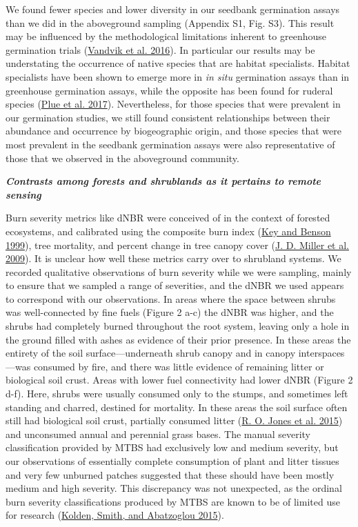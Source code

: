 \documentclass[
  12pt,
]{article}
\begin{document}
We found fewer species and lower diversity in our seedbank germination
assays than we did in the aboveground sampling (Appendix S1, Fig. S3).
This result may be influenced by the methodological limitations inherent
to greenhouse germination trials
(\protect\hyperlink{ref-Vandvik2016}{Vandvik et al. 2016}). In
particular our results may be understating the occurrence of native
species that are habitat specialists. Habitat specialists have been
shown to emerge more in \emph{in situ} germination assays than in
greenhouse germination assays, while the opposite has been found for
ruderal species (\protect\hyperlink{ref-Plue2017}{Plue et al. 2017}).
Nevertheless, for those species that were prevalent in our germination
studies, we still found consistent relationships between their abundance
and occurrence by biogeographic origin, and those species that were most
prevalent in the seedbank germination assays were also representative of
those that we observed in the aboveground community.

\textbf{\emph{Contrasts among forests and shrublands as it pertains to
remote sensing}}

Burn severity metrics like dNBR were conceived of in the context of
forested ecosystems, and calibrated using the composite burn index
(\protect\hyperlink{ref-Key1999}{Key and Benson 1999}), tree mortality,
and percent change in tree canopy cover
(\protect\hyperlink{ref-Miller2009}{J. D. Miller et al. 2009}). It is
unclear how well these metrics carry over to shrubland systems. We
recorded qualitative observations of burn severity while we were
sampling, mainly to ensure that we sampled a range of severities, and
the dNBR we used appears to correspond with our observations. In areas
where the space between shrubs was well-connected by fine fuels (Figure
2 a-c) the dNBR was higher, and the shrubs had completely burned
throughout the root system, leaving only a hole in the ground filled
with ashes as evidence of their prior presence. In these areas the
entirety of the soil surface---underneath shrub canopy and in canopy
interspaces---was consumed by fire, and there was little evidence of
remaining litter or biological soil crust. Areas with lower fuel
connectivity had lower dNBR (Figure 2 d-f). Here, shrubs were usually
consumed only to the stumps, and sometimes left standing and charred,
destined for mortality. In these areas the soil surface often still had
biological soil crust, partially consumed litter
(\protect\hyperlink{ref-Jones2015}{R. O. Jones et al. 2015}) and
unconsumed annual and perennial grass bases. The manual severity
classification provided by MTBS had exclusively low and medium severity,
but our observations of essentially complete consumption of plant and
litter tissues and very few unburned patches suggested that these should
have been mostly medium and high severity. This discrepancy was not
unexpected, as the ordinal burn severity classifications produced by
MTBS are known to be of limited use for research
(\protect\hyperlink{ref-Kolden2015}{Kolden, Smith, and Abatzoglou
2015}).
\end{document}

